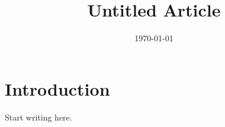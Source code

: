 \documentclass[11pt]{article}
\title{Untitled Article}
\author{}
\date{\today}
\begin{document}
\maketitle

\section{Introduction}

Start writing here.



\end{document}
